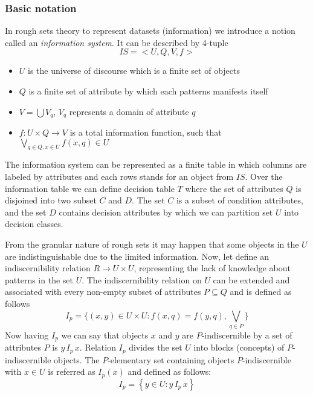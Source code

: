\subsubsection{Basic notation}
\label{cha:Rough_set_basic_notation}
In rough sets theory to represent datasets (information) we introduce a notion 
called an \textit{information system}. It can be described by 4-tuple
$$IS = <U, Q, V, f >$$ 
\begin{itemize}
    \item $U$ is the universe of discourse  which is a finite set of objects
    \item $Q$ is a finite set of attribute by  which each patterns manifests itself
    \item $V = \bigcup V_q$, $V_q$ represents a domain of attribute $q$
    \item $f:U \times Q \rightarrow V$ is a total information function, such that
        $\bigvee_{q\in Q, x \in U} f(x,q) \in U$
\end{itemize} 
The information system can be represented as a finite table in which 
columns are labeled by attributes and each rows stands for an object from
$IS$. Over the information table we can define decision table
$T$ where the set of attributes $Q$ is disjoined into two
subset $C$ and $D$. The set $C$ is a subset of 
condition attributes, and the set $D$ contains decision attributes 
by which we can partition set $U$ into decision classes.

From the granular nature of rough sets it may happen that some objects 
in the $U$ are indistinguishable due to the limited information. Now, let
define an indiscernibility relation $R \rightarrow U \times U$, representing the 
lack of knowledge about patterns in the set $U$. The indiscernibility relation on
$U$ can be extended and associated with every non-empty subset of attributes $P \subseteq Q$
and is defined as follows 
$$I_p = \{ (x, y) \in U \times U: f(x, q) = f(y,q), \bigvee_{q \in P}\}$$ 
Now having $I_p$ we can say that objects $x$ and
$y$ are $P$-indiscernible by a set of attributes $P$ is $y \, I_p \, x$. Relation
$I_p$ divides the set $U$ into blocks (concepts) of $P$-indiscernible objects.
The $P$-elementary set containing objects $P$-indiscernible with $x \in U$ is
referred as $I_p(x)$ and defined as follows:
$$I_p = \left\{ y \in U: y \, I_p \, x \right\}$$

